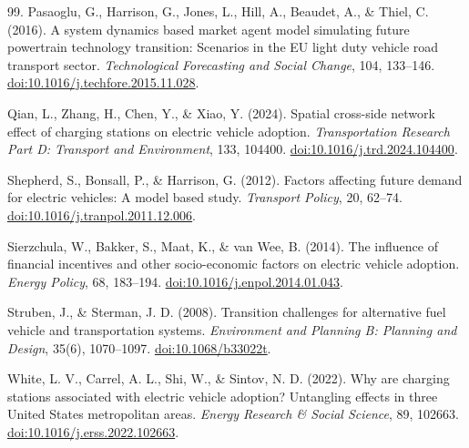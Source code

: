 \documentclass[11pt]{article} %
\begin{document}
\begin{thebibliography}{99.}
Pasaoglu, G., Harrison, G., Jones, L., Hill, A., Beaudet, A., \& Thiel, C. (2016).
A system dynamics based market agent model simulating future powertrain
technology transition: Scenarios in the EU light duty vehicle road transport
sector.
\emph{Technological Forecasting and Social Change}, 104, 133--146.
\href{https://doi.org/10.1016/j.techfore.2015.11.028}{doi:10.1016/j.techfore.2015.11.028}.

Qian, L., Zhang, H., Chen, Y., \& Xiao, Y. (2024).
Spatial cross-side network effect of charging stations on electric vehicle
adoption.
\emph{Transportation Research Part D: Transport and Environment}, 133, 104400.
\href{https://doi.org/10.1016/j.trd.2024.104400}{doi:10.1016/j.trd.2024.104400}.

Shepherd, S., Bonsall, P., \& Harrison, G. (2012).
Factors affecting future demand for electric vehicles: A model based study.
\emph{Transport Policy}, 20, 62--74.
\href{https://doi.org/10.1016/j.tranpol.2011.12.006}{doi:10.1016/j.tranpol.2011.12.006}.

Sierzchula, W., Bakker, S., Maat, K., \& van Wee, B. (2014).
The influence of financial incentives and other socio-economic factors on
electric vehicle adoption.
\emph{Energy Policy}, 68, 183--194.
\href{https://doi.org/10.1016/j.enpol.2014.01.043}{doi:10.1016/j.enpol.2014.01.043}.

Struben, J., \& Sterman, J. D. (2008).
Transition challenges for alternative fuel vehicle and transportation systems.
\emph{Environment and Planning B: Planning and Design}, 35(6), 1070--1097.
\href{https://doi.org/10.1068/b33022t}{doi:10.1068/b33022t}.

White, L. V., Carrel, A. L., Shi, W., \& Sintov, N. D. (2022).
Why are charging stations associated with electric vehicle adoption? Untangling
effects in three United States metropolitan areas.
\emph{Energy Research \& Social Science}, 89, 102663.
\href{https://doi.org/10.1016/j.erss.2022.102663}{doi:10.1016/j.erss.2022.102663}.

\end{thebibliography}
\end{document}
